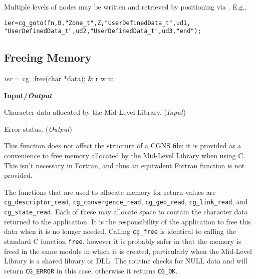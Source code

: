 Multiple levels of  nodes may be written and
retrieved by positioning via .
E.g.,
\begin{alltt}
   ier = cg\_goto(fn, B, "Zone\_t", Z, "UserDefinedData\_t", ud1, 
                 "UserDefinedData\_t", ud2, "UserDefinedData\_t", ud3, "end");
\end{alltt}

\subsection{Freeing Memory}
\label{s:free}

\begin{fctbox}
\textcolor{output}{\textit{ier}} = cg\_free(\textcolor{input}{char *data}); & r w m \\
\end{fctbox}

\noindent
\textbf{\textcolor{input}{Input}/\textcolor{output}{\textit{Output}}}

\begin{Ventryi}{}\raggedright
\item [\fort{data}]
      Character data allocated by the Mid-Level Library.
      (\textcolor{input}{\textit{Input}})
\item [\fort{ier}]
      Error status.
      (\textcolor{output}{\textit{Output}})
\end{Ventryi}

This function does not affect the structure of a CGNS file; it is
provided as a convenience to free memory allocated by the Mid-Level
Library when using C.
This isn't necessary in Fortran, and thus an equivalent Fortran function
is not provided.

The functions that are used to allocate memory for return values are
\texttt{cg\_descriptor\_read}, \texttt{cg\_convergence\_read},
\texttt{cg\_geo\_read}, \texttt{cg\_link\_read}, and
\texttt{cg\_state\_read}.
Each of these may allocate space to contain the character data returned
to the application.
It is the responsibility of the application to free this data when it is
no longer needed.
Calling \texttt{cg\_free} is identical to calling the standard C function
\texttt{free}, however it is probably safer in that the memory is
freed in the same module in which it is created, particularly when the
Mid-Level Library is a shared library or DLL.
The routine checks for NULL data and will return \texttt{CG\_ERROR} in
this case, otherwise it returns \texttt{CG\_OK}.
